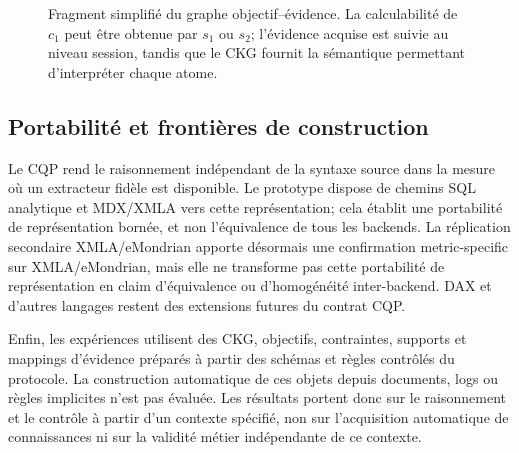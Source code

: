 \documentclass[journal]{IEEEtran}
\begin{document}
\begin{figure}[!t]
\centering
{}
\caption{Fragment simplifié du graphe objectif--évidence. La calculabilité de $c_1$ peut être obtenue par $s_1$ ou $s_2$; l'évidence acquise est suivie au niveau session, tandis que le CKG fournit la sémantique permettant d'interpréter chaque atome.}
\label{fig:ckg-fragment}
\end{figure}

\subsection{Portabilité et frontières de construction}

Le CQP rend le raisonnement indépendant de la syntaxe source dans la mesure où un extracteur fidèle est disponible. Le prototype dispose de chemins SQL analytique et MDX/XMLA vers cette représentation; cela établit une portabilité de représentation bornée, et non l'équivalence de tous les backends. La réplication secondaire XMLA/eMondrian apporte désormais une confirmation metric-specific sur XMLA/eMondrian, mais elle ne transforme pas cette portabilité de représentation en claim d'équivalence ou d'homogénéité inter-backend. DAX et d'autres langages restent des extensions futures du contrat CQP.

Enfin, les expériences utilisent des CKG, objectifs, contraintes, supports et mappings d'évidence préparés à partir des schémas et règles contrôlés du protocole. La construction automatique de ces objets depuis documents, logs ou règles implicites n'est pas évaluée. Les résultats portent donc sur le raisonnement et le contrôle à partir d'un contexte spécifié, non sur l'acquisition automatique de connaissances ni sur la validité métier indépendante de ce contexte.
\end{document}
